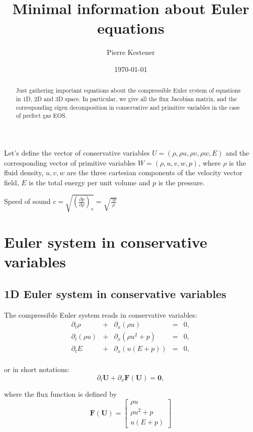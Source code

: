 \documentclass{article}
\title{Minimal information about Euler equations}
\author{Pierre Kestener}
\date{\today}
\begin{document}
\maketitle

\begin{abstract}
Just gathering important equations about the compressible Euler system of equations in 1D, 2D and 3D space. In particular, we give all the flux Jacobian matrix, and the corresponding eigen decomposition in conservative and primitive variables in the case of perfect gas EOS.
\end{abstract}

Let's define the vector of conservative variables $U=(\rho, \rho u, \rho v, \rho w, E)$ and the corresponding vector of primitive variables $W=(\rho, u, v, w, p)$, where $\rho$ is the fluid density, $u,v,w$ are the three cartesian components of the velocity vector field, $E$ is the total energy per unit volume and $p$ is the pressure.

Speed of sound $c=\sqrt{\left(\frac{\partial p}{\partial \rho}\right)_s} = \sqrt{\frac{\gamma p}{\rho}}$

\section{Euler system in conservative variables}

\subsection*{1D Euler system in conservative variables}
The compressible Euler system reads in conservative variables:\\
\begin{equation}
  \begin{array}{ccccc}
    \partial_t \rho & + & \partial_x(\rho u) & = & 0,\\
    \partial_t (\rho u) & + & \partial_x(\rho u^2+p) & = & 0,\\
    \partial_t E & + & \partial_x (u(E+p)) & = & 0,\\
  \end{array}
\end{equation}

or in short notations:
\begin{equation*}
  \partial_t \mathbf{U} + \partial_x \mathbf{F(U)} = \mathbf{0},
\end{equation*}

where the flux function is defined by
\begin{equation}
  \mathbf{F(U)} = \left [
  \begin{array}{c}
    \rho u \\
    \rho u^2 + p \\
    u (E + p)
  \end{array} \right]
\end{equation}
\end{document}
